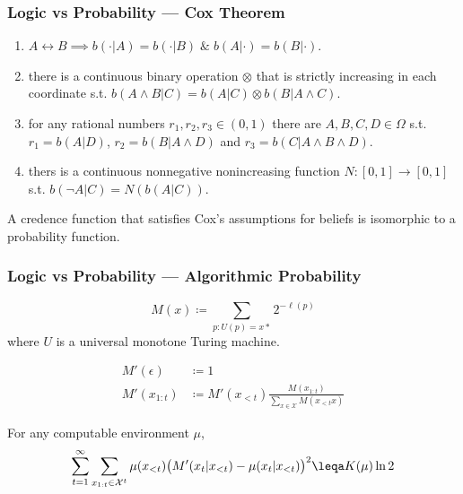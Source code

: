 \documentclass[UTF8,aspectratio=43,11pt,colorlinks,compress,openany]{beamer}%
\begin{document}
\begin{frame}\frametitle{Logic vs Probability --- Cox Theorem}
\begin{center}
\end{center}
\begin{assumption}
\begin{enumerate}
	\item $A\leftrightarrow B\implies b(\cdot|A)=b(\cdot|B)\;\&\;b(A|\cdot)=b(B|\cdot)$.
	\item there is a continuous binary operation $\otimes$ that is strictly increasing in each coordinate s.t. $b(A\wedge B|C)=b(A|C)\otimes b(B|A\wedge C)$.
	\item for any rational numbers $r_1,r_2,r_3\in (0,1)$ there are $A,B,C,D\in\Omega$ s.t. $r_1=b(A|D)$, $r_2=b(B|A\wedge D)$ and $r_3=b(C|A\wedge B\wedge D)$.
	\item thers is a continuous nonnegative nonincreasing function $N: [0,1]\to [0,1]$ s.t. $b(\neg A|C)=N(b(A|C))$.
\end{enumerate}
\end{assumption}
\begin{theorem}
A credence function that satisfies Cox's assumptions for beliefs is isomorphic to a probability function.
\end{theorem}
\end{frame}

\begin{frame}\frametitle{Logic vs Probability --- Algorithmic Probability}
\setlength\abovedisplayskip{0pt}
\setlength\belowdisplayskip{0pt}
\begin{definition}
	\[M(x)\coloneqq \sum\limits_{p:U(p)=x*}2^{-\ell(p)}\]
	where $U$ is a universal monotone Turing machine.
\end{definition}
\begin{align*}
	M'(\epsilon)&\coloneqq 1\\
	M'(x_{1:t})&\coloneqq M'(x_{<t})\frac{M(x_{1:t})}{\sum\limits_{x\in\mathcal{X}}M(x_{<t}x)}
\end{align*}
\begin{theorem}
		For any computable environment $\mu$,
		\[\sum\limits_{t=1}^\infty\sum\limits_{x_{1:t}\in\mathcal{X}^t}\mu(x_{<t})\big(M'(x_t|x_{<t})-\mu(x_t|x_{<t})\big)^2\leqa K(\mu)\ln2\]
\end{theorem}
\end{frame}
\end{document}
